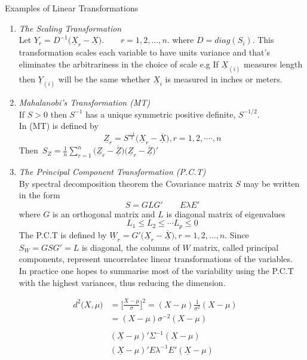 \documentclass[11pt,a4paper]{article}
\theoremstyle{definition}
\begin{document}
Examples of Linear Transformations\\
\begin{enumerate}
\item \textit{The Scaling Transformation}\\
Let $Y_r=D^{-1}\big(\underline{X}_r-\underline{X}\big).\qquad r=1,2,\ldots, n.$ where $D=diag(S_i)$. This transformation scales each variable to have units variance and that's eliminates the arbitrariness in the choice of scale e.g If $\underline{X}_{(i)}$ measures length then $\underline{Y}_{(i)}$ will be the same whether $\underline{X}_i$ is measured in inches or meters.

\item \textit{Mahalanobi's Transformation (MT)}\\
If $S>0$ then $S^{-1}$ has a unique symmetric positive definite, $S^{-1/2}$.\\
In (MT) is defined by $$\underline{Z}_r=S^{{\frac{-1}{2}}} \big(\underline{X}_r-\overline{\underline{X}}\big),  r=1,2,\cdot\cdots,n$$
Then \,$\displaystyle{S_Z=\frac{1}{n}\sum^n_{r=1}\big(\underline{Z}_r-\overline{\underline{Z}}\big)\big(\underline{Z}_r-\overline{\underline{Z}}\big)'}$

\item \textit{The Principal Component Transformation (P.C.T)}\\
By spectral decomposition theorem the Covariance matrix $S$ may be written in the form $$S=GLG'\qquad  E\lambda E'$$
where $G$ is an orthogonal matrix and $L$ is diagonal matrix of eigenvalues $$L_1\leq L_2\leq \cdots L_p\leq 0$$ The P.C.T is defined by $\underline{W}_r=G'\big(\underline{X}_r-\overline{\underline{X}}\big),  r=1,2,\ldots,n$. Since\\ $S_W=GSG'=L$ is diagonal, the columns of $W$ matrix, called principal components, represent uncorrelatec linear transformations of the variables.\\
In practice one hopes to summarise most of the variability using the P.C.T with the highest variances, thus reducing the dimension.
\end{enumerate}




\begin{align*}
d^2\big(X,\mu) & = \Bigg[\frac{X-\mu}{\sigma}\Bigg]^2
                 = (X-\mu) \frac{1}{\sigma^2}(X-\mu)\\
               & = (X-\mu)\sigma^{-2}(X-\mu)\\\\
               & (\underline{X}-\mu)'\Sigma^{-1}(\underline{X}-\mu)\\
               & (\underline{X}-\mu)'E\lambda^{-1}E'(\underline{X}-\mu)       
\end{align*}
\pagebreak
\end{document}
